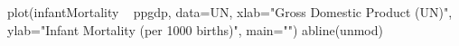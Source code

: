 \begin{Schunk}
\begin{Sinput}
 plot(infantMortality ~ ppgdp, data=UN, xlab="Gross Domestic Product (UN)", ylab="Infant Mortality (per 1000 births)", main="")
 abline(unmod)
\end{Sinput}
\end{Schunk}
